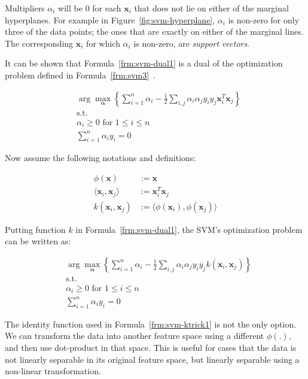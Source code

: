 Multipliers $\alpha_i$ will be $0$ for each $\mathbf{x}_i$ that does not lie on either of the marginal hyperplanes. For example in Figure~\ref{fig:svm-hyperplane}, $\alpha_i$ is non-zero for only three of the data points; the ones that are exactly on either of the marginal lines. The corresponding $\mathbf{x}_i$ for which $\alpha_i$ is non-zero, are \emph{support vectors}.

It can be shown that Formula~\ref{frm:svm-dual1} is a dual of the optimization problem defined in Formula~\ref{frm:svm3}~\cite[TODO:chapter]{learning-with-kernels}.

\begin{align}
  &\arg\max_{\boldsymbol{\alpha}}\left\{\sum_{i=1}^n \alpha_i - \frac{1}{2}\sum_{i, j} \alpha_i \alpha_j y_i y_j \mathbf{x}_i^T \mathbf{x}_j\right\} \nonumber \\
  &\text{s.t.} \nonumber \\
  &\alpha_i \geq 0 \text{ for } 1 \leq i \leq n \nonumber \\
  &\sum_{i=1}^{n}\alpha_i y_i = 0
  \label{frm:svm-dual1}
\end{align}

Now assume the following notations and definitions:

\begin{align}
  \phi(\mathbf{x}) &:= \mathbf{x} \nonumber \\
  \langle \mathbf{x}_i, \mathbf{x}_j \rangle &:= \mathbf{x}_i^T \mathbf{x}_j \nonumber \\
  k(\mathbf{x}_i, \mathbf{x}_j) &:= \langle \phi(\mathbf{x}_i), \phi(\mathbf{x}_j) \rangle
  \label{frm:svm-ktrick1}
\end{align}

Putting function $k$ in Formula~\ref{frm:svm-dual1}, the SVM's optimization problem can be written as:

\begin{align}
  &\arg\max_{\boldsymbol{\alpha}}\left\{\sum_{i=1}^n \alpha_i - \frac{1}{2}\sum_{i, j} \alpha_i \alpha_j y_i y_j k(\mathbf{x}_i, \mathbf{x}_j)\right\} \nonumber \\
  &\text{s.t.} \nonumber \\
  &\alpha_i \geq 0 \text{ for } 1 \leq i \leq n \nonumber \\
  &\sum_{i=1}^{n}\alpha_i y_i = 0
  \label{frm:svm-dual2}
\end{align}

The identity function used in Formula~\ref{frm:svm-ktrick1} is not the only option. We can transform the data into another feature space using a different $\phi(.)$, and then use dot-product in that space. This is useful for cases that the data is not linearly separable in its original feature space, but linearly separable using a non-linear transformation.

